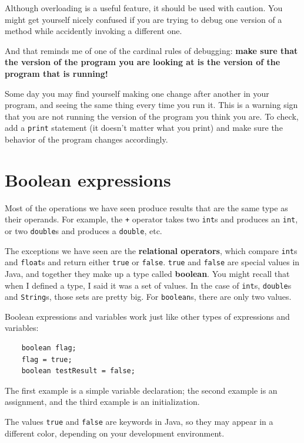 Although overloading is a useful feature, it should be used
with caution.  You might get yourself nicely confused if you
are trying to debug one version of a method while accidently
invoking a different one.

And that reminds me of one of the cardinal rules of
debugging: {\bf make sure that the version of the program
you are looking at is the version of the program that is running!}

Some day you may find yourself making one change after another
in your program, and seeing the same thing every time you run it.
This is a warning sign that you are
not running the version of the program you think you are.  To
check, add a {\tt print} statement (it doesn't matter what
you print) and make sure the behavior of the program changes
accordingly.


\section{Boolean expressions}

Most of the operations we have seen produce results that are
the same type as their operands.  For example, the {\tt +} operator
takes two {\tt int}s and produces an {\tt int}, or two {\tt double}s
and produces a {\tt double}, etc.


The exceptions we have seen are the {\bf relational operators}, which
compare {\tt int}s and {\tt float}s and return either {\tt true} or
{\tt false}.  {\tt true} and {\tt false} are special values in Java,
and together they make up a type called {\bf boolean}.  You might
recall that when I defined a type, I said it was a set of values.  In
the case of {\tt int}s, {\tt double}s and {\tt String}s, those sets
are pretty big.  For {\tt boolean}s, there are only two values.

Boolean expressions and variables work just like other types of
expressions and variables:

\begin{lstlisting}
    boolean flag;
    flag = true;
    boolean testResult = false;
\end{lstlisting}
%
The first example is a simple variable declaration;
the second example is an assignment, and the third example is an
initialization.

The values {\tt true} and {\tt false}
are keywords in Java, so they may appear in a different color,
depending on your development environment.


